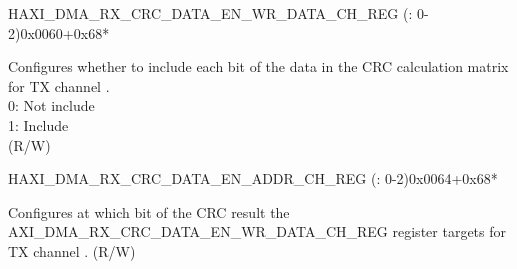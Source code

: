 \begin{register}{H}{AXI\_DMA\_RX\_CRC\_DATA\_EN\_WR\_DATA\_CH\_REG (: 0-2)}{0x0060+0x68*}\label{regdesc:AXIDMARXCRCDATAENWRDATACHNREG}
%
%
\regnewline%
\begin{regdesc}\begin{reglist}
\label{fielddesc:AXIDMARXCRCDATAENWRDATACHN}\item [AXI\_DMA\_RX\_CRC\_DATA\_EN\_WR\_DATA\_CH\regindex{n}] Configures whether to include each bit of the data in the CRC calculation matrix for TX channel .\\
0: Not include\\
1: Include\\ (R/W)
\end{reglist}\end{regdesc}
\end{register}


\begin{register}{H}{AXI\_DMA\_RX\_CRC\_DATA\_EN\_ADDR\_CH\_REG (: 0-2)}{0x0064+0x68*}\label{regdesc:AXIDMARXCRCDATAENADDRCHNREG}
%
\regnewline%
\begin{regdesc}\begin{reglist}
\label{fielddesc:AXIDMARXCRCDATAENADDRCHN}\item [AXI\_DMA\_RX\_CRC\_DATA\_EN\_ADDR\_CH\regindex{n}] Configures at which bit of the CRC result the AXI\_DMA\_RX\_CRC\_DATA\_EN\_WR\_DATA\_CH\_REG register targets for TX channel . (R/W)
\end{reglist}\end{regdesc}
\end{register}


